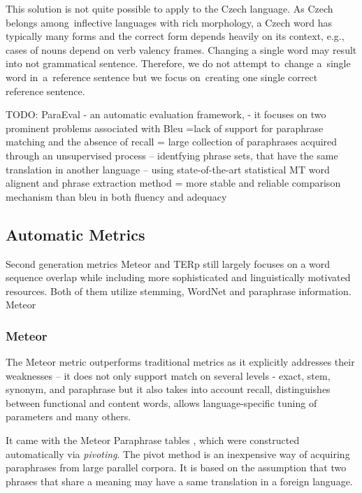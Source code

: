 \documentclass[11pt]{article}
\begin{document}
This solution is not quite possible to apply to the Czech language. As Czech 
belongs among~inflective languages with rich morphology, a Czech word has 
typically many forms and the correct form depends heavily on its context, 
e.g., cases of nouns depend on verb valency frames. Changing a single word may 
result into not grammatical sentence. Therefore, we do not attempt to~change 
a~single word in~a~reference sentence but we focus on~creating one single 
correct reference sentence.


TODO:
\cite{Zhou:2006}
ParaEval - an automatic evaluation framework, 
- it focuses on two prominent problems associated with Bleu =lack of support for paraphrase
matching and the absence of recall
= large  collection of paraphrases acquired through an unsupervised process -- identfying
phrase sets, that have the same translation in another language -- using state-of-the-art
statistical MT word alignent and phrase extraction method
= more stable and reliable comparison mechanism than bleu in both fluency and adequacy

\subsection{Automatic Metrics}
Second generation metrics Meteor and TERp still largely focuses on a word sequence 
overlap while including more sophisticated and linguistically motivated resources. 
Both of them utilize stemming, WordNet and paraphrase information. Meteor


\subsubsection{Meteor}
The Meteor metric outperforms traditional metrics as it explicitly addresses 
their weaknesses -- it does not only support match on several levels -  exact, 
stem, synonym, and paraphrase but it also takes into account recall, 
distinguishes between functional and content words, allows language-specific 
tuning of parameters and many others.

It came with the Meteor Paraphrase tables \cite{meteor-tables}, which were
constructed automatically via \textit{pivoting}. \cite{pivoting} The pivot 
method is an inexpensive way of acquiring paraphrases from large parallel 
corpora. It is based on the assumption that two phrases that share a meaning 
may have a same translation in a foreign language. \cite{dyvik}
\end{document}
